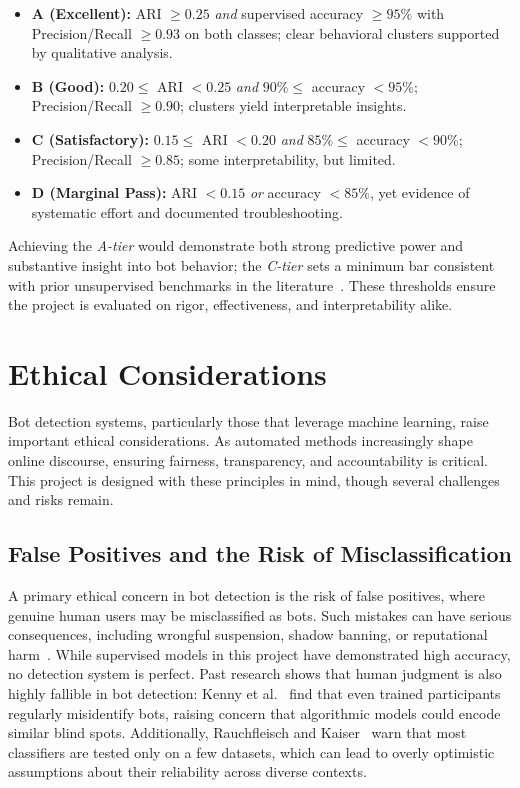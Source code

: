 \documentclass[10pt,twocolumn]{article}
\begin{document}
\begin{itemize}
    \item \textbf{A (Excellent):} ARI $\ge 0.25$ \emph{and} supervised accuracy $\ge 95\%$ with Precision/Recall $\ge 0.93$ on both classes; clear behavioral clusters supported by qualitative analysis.
    \item \textbf{B (Good):} $0.20 \le$ ARI $< 0.25$ \emph{and} $90\% \le$ accuracy $< 95\%$; Precision/Recall $\ge 0.90$; clusters yield interpretable insights.
    \item \textbf{C (Satisfactory):} $0.15 \le$ ARI $< 0.20$ \emph{and} $85\% \le$ accuracy $< 90\%$; Precision/Recall $\ge 0.85$; some interpretability, but limited.
    \item \textbf{D (Marginal Pass):} ARI $< 0.15$ \emph{or} accuracy $< 85\%$, yet evidence of systematic effort and documented troubleshooting.
\end{itemize}

Achieving the \emph{A-tier} would demonstrate both strong predictive power and substantive insight into bot behavior; the \emph{C-tier} sets a minimum bar consistent with prior unsupervised benchmarks in the literature~\cite{Yang2023anatomy}. These thresholds ensure the project is evaluated on rigor, effectiveness, and interpretability alike.


\section{Ethical Considerations}

Bot detection systems, particularly those that leverage machine learning, raise important ethical considerations. As automated methods increasingly shape online discourse, ensuring fairness, transparency, and accountability is critical. This project is designed with these principles in mind, though several challenges and risks remain.

\subsection{False Positives and the Risk of Misclassification}

A primary ethical concern in bot detection is the risk of false positives, where genuine human users may be misclassified as bots. Such mistakes can have serious consequences, including wrongful suspension, shadow banning, or reputational harm~\cite{Rauchfleisch2020the}. While supervised models in this project have demonstrated high accuracy, no detection system is perfect. Past research shows that human judgment is also highly fallible in bot detection: Kenny et al.~\cite{Kenny2022duped} find that even trained participants regularly misidentify bots, raising concern that algorithmic models could encode similar blind spots. Additionally, Rauchfleisch and Kaiser~\cite{Rauchfleisch2020the} warn that most classifiers are tested only on a few datasets, which can lead to overly optimistic assumptions about their reliability across diverse contexts. 
\end{document}
